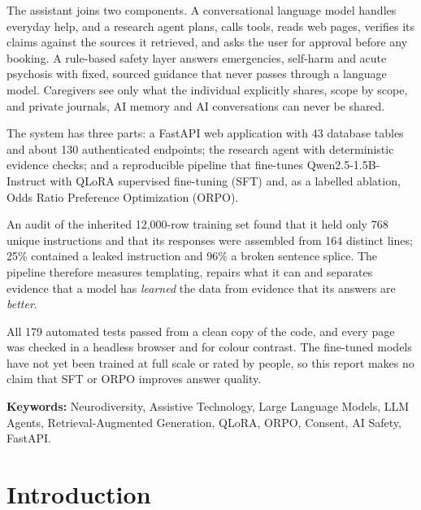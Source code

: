 \documentclass[11pt,a4paper]{article}
\begin{document}
The assistant joins two components. A conversational language model handles everyday help, and
a research agent plans, calls tools, reads web pages, verifies its claims against the sources
it retrieved, and asks the user for approval before any booking. A rule-based safety layer answers
emergencies, self-harm and acute psychosis with fixed, sourced guidance that never passes
through a language model. Caregivers see only what the individual explicitly shares, scope by scope,
and private journals, AI memory and AI conversations can never be shared.

The system has three parts: a FastAPI web application with 43 database tables and about 130
authenticated endpoints; the research agent with deterministic evidence checks; and a
reproducible pipeline that fine-tunes Qwen2.5-1.5B-Instruct with QLoRA supervised fine-tuning
(SFT) and, as a labelled ablation, Odds Ratio Preference Optimization (ORPO).

An audit of the inherited 12,000-row training set found that it held only 768 unique
instructions and that its responses were assembled from 164 distinct lines; 25\% contained a
leaked instruction and 96\% a broken sentence splice. The pipeline therefore measures templating,
repairs what it can and separates evidence that a model has \emph{learned} the data from evidence
that its answers are \emph{better}.

All 179 automated tests passed from a clean copy of the code, and every page was checked in a headless
browser and for colour contrast. The fine-tuned models have not yet been trained at full scale or rated by
people, so this report makes no claim that SFT or ORPO improves answer quality.

\textbf{Keywords:} Neurodiversity, Assistive Technology, Large Language Models, LLM Agents,
Retrieval-Augmented Generation, QLoRA, ORPO, Consent, AI Safety, FastAPI.

\clearpage
{}
\tableofcontents
\clearpage
{}
\listoffigures
\listoftables
\lstlistoflistings
\clearpage

\setcounter{page}{1}

\section{Introduction}
\end{document}

